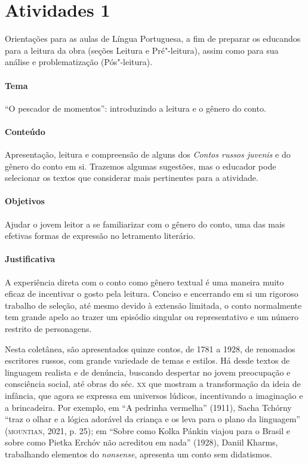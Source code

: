 \documentclass[11pt]{extarticle}
\begin{document}
\section{Atividades 1}


Orientações para as aulas de Língua Portuguesa, a fim de preparar
os educandos para a leitura da obra (seções Leitura e Pré"-leitura), assim como para
sua análise e problematização (Pós"-leitura).

\paragraph{Tema} ``O pescador de momentos'': introduzindo a leitura e o gênero do conto.

\paragraph{Conteúdo}
Apresentação, leitura e compreensão de alguns dos \emph{Contos russos
juvenis} e do gênero do conto em si. Trazemos algumas sugestões, mas o
educador pode selecionar os textos que considerar mais pertinentes para
a atividade.

\paragraph{Objetivos}
Ajudar o jovem leitor a se familiarizar com o gênero do conto, uma das
mais efetivas formas de expressão no letramento literário.

\paragraph{Justificativa}
A experiência direta com o conto como gênero textual é uma maneira muito
eficaz de incentivar o gosto pela leitura. Conciso e encerrando em si um
rigoroso trabalho de seleção, até mesmo devido à extensão limitada, o
conto normalmente tem grande apelo ao trazer um episódio singular ou
representativo e um número restrito de personagens.

Nesta coletânea, são apresentados quinze contos, de 1781 a 1928, de
renomados escritores russos, com grande variedade de temas e estilos. Há
desde textos de linguagem realista e de denúncia, buscando despertar no
jovem preocupação e consciência social, até obras do séc. \textsc{xx} que mostram
a transformação da ideia de infância, que agora se expressa em universos
lúdicos, incentivando a imaginação e a brincadeira. Por exemplo, em ``A
pedrinha vermelha'' (1911), Sacha Tchórny ``traz o olhar e a
lógica adorável da criança e os leva para o plano da linguagem''
(\textsc{mountian}, 2021, p. 25); em ``Sobre como Kolka Pánkin viajou para o
Brasil e sobre como Pietka Erchóv não acreditou em nada'' (1928), Daniil
Kharms, trabalhando elementos do \emph{nonsense}, apresenta um conto sem didatismos.
\end{document}
